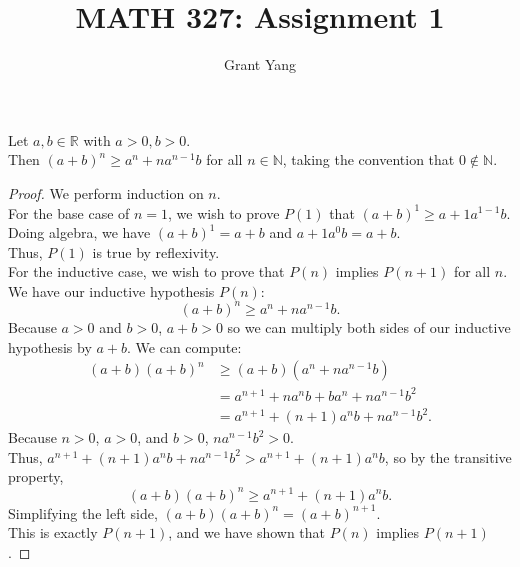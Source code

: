 \documentclass{article}
\newenvironment{theorem}[1]{\renewcommand\theinnercustomthm{#1}\innercustomthm}
  {\endinnercustomthm}
\begin{document}
\title{MATH 327: Assignment 1}
\author{Grant Yang}
\maketitle

\begin{theorem}{1}
Let $a,b\in \mathbb R$ with $a>0,b>0$.\\
Then $(a+b)^n \ge a^n +n a^{n-1}b$ for all $n \in \mathbb N$, taking the convention that $0 \not \in \mathbb N$.
\end{theorem}
\begin{proof}
    We perform induction on $n$. \\
    For the base case of $n=1$, we wish to prove $P(1)$ that $(a+b)^1 \ge a + 1 a^{1-1} b$. \\
    Doing algebra, we have $(a + b)^1 = a+b$ and $a+1a^0b = a+b$. \\
    Thus, $P(1)$ is true by reflexivity. \\
    For the inductive case, we wish to prove that $P(n)$ implies $P(n+1)$ for all $n$. \\
    We have our inductive hypothesis $P(n)$:
    \[
        (a+b)^n \ge a^n+n a^{n-1}b.
    \]
    Because $a > 0$ and $b > 0$, $a+b > 0$ so we can multiply both sides of our inductive hypothesis by $a+b$.
    We can compute:
    \begin{align*}
        (a+b)(a+b)^n &\ge (a+b)(a^n + n a^{n-1}b) \\
        &= a^{n+1} + n a^n b + b a^n + n a^{n-1} b^2 \\
        &= a^{n+1}+(n+1)a^n b + na^{n-1}b^2.
    \end{align*}
    Because $n>0$, $a>0$, and $b > 0$, $na^{n-1}b^2 > 0$. \\
    Thus, $a^{n+1} + (n+1)a^n b + na^{n-1}b^2 > a^{n+1}+(n+1)a^nb$, so by the transitive property,
    \[(a+b)(a+b)^n \ge a^{n+1}+(n+1)a^n b.\]
    Simplifying the left side, $(a+b)(a+b)^n = (a+b)^{n+1}$. \\
    This is exactly $P(n+1)$, and we have shown that $P(n)$ implies $P(n+1)$.
\end{proof}
\end{document}
